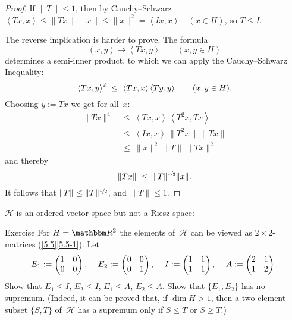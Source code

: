 \documentclass[main.tex]{subfiles}
\begin{document}
\begin{proof}
If $\|T\|\leq 1$,
then by Cauchy--Schwarz 
$\left<Tx,x\right>
\leq \|Tx\|\,\|x\|
\leq\|x\|^2
=\left<Ix,x\right>\quad(x\in H)$,
so $T\leq I$.

The reverse implication is harder to prove.
The formula 
\begin{equation*}
(x,y) \mapsto \left< Tx, y \right>\qquad (x,y\in H)
\end{equation*}
determines a semi-inner product,
to which we can apply the Cauchy--Schwarz Inequality:
\begin{equation*}
\left< Tx, y\right>^2\ \leq\ \left<Tx,x\right>\left<Ty,y\right>
\qquad(x,y\in H)\text{.}
\end{equation*}
Choosing $y:=Tx$ we get for all~$x$:
\begin{align*}
\|Tx\|^4\ &\leq\ \left<Tx, x\right>\,\left< T^2x,Tx\right> \\
          &\leq\ \left<Ix, x\right>\,\|T^2 x\|\,\|Tx\| \\
          &\leq\ \|x\|^2\,\|T\|\,\|Tx\|^2
\end{align*}
and thereby
\begin{equation*}
\|Tx\|\ \leq\ \|T\|^{\sfrac{1}{2}} \|x\|\text{.}
\end{equation*}
It follows that $\|T\|\leq \|T\|^{\sfrac{1}{2}}$,
and $\|T\|\leq 1$. \xqed
\end{proof}
%
%
\noindent$\mathscr H$ is an ordered vector space
but not a Riesz space:
\begin{psec}{5.11}{Exercise}
For $H=\R^2$
the elements of~$\mathscr H$ can be viewed as $2\times 2$-matrices
(\ref{5.5}\ref{5.5-1}).
Let
\begin{equation*}
E_1 := \begin{pmatrix}1&0\\0&0\end{pmatrix}\text{, }\quad
E_2 := \begin{pmatrix}0&0\\0&1\end{pmatrix}\text{, }\quad
I   := \begin{pmatrix}1&1\\1&1\end{pmatrix}\text{, }\quad
A   := \begin{pmatrix}2&1\\1&2\end{pmatrix}\text{.}
\end{equation*}
Show that $E_1\leq I$, $E_2\leq I$, $E_1\leq A$, $E_2\leq A$.
Show that $\{E_1,E_2\}$ has no supremum.
(Indeed,
it can be proved that,
if $\dim H>1$,
then a two-element subset $\{S,T\}$ of~$\mathscr H$
has a supremum only if $S\leq T$
or $S\geq T$.)
\end{psec}
\end{document}
